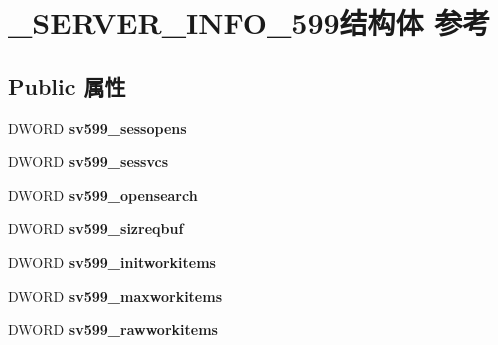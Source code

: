 \hypertarget{struct___s_e_r_v_e_r___i_n_f_o__599}{}\section{\+\_\+\+S\+E\+R\+V\+E\+R\+\_\+\+I\+N\+F\+O\+\_\+599结构体 参考}
\label{struct___s_e_r_v_e_r___i_n_f_o__599}
\subsection*{Public 属性}
\begin{DoxyCompactItemize}
\item 
\mbox{\label{struct___s_e_r_v_e_r___i_n_f_o__599_ae3a03367f6ae00a89f0eced51fe364fc}} 
D\+W\+O\+RD {\bfseries sv599\+\_\+sessopens}
\item 
\mbox{\label{struct___s_e_r_v_e_r___i_n_f_o__599_a2b73fc6352cf9ce4fa5232a3596e85be}} 
D\+W\+O\+RD {\bfseries sv599\+\_\+sessvcs}
\item 
\mbox{\label{struct___s_e_r_v_e_r___i_n_f_o__599_a9fa1b2f721e167e4da70370e2d5b202f}} 
D\+W\+O\+RD {\bfseries sv599\+\_\+opensearch}
\item 
\mbox{\label{struct___s_e_r_v_e_r___i_n_f_o__599_ab2aee9f0fbc8bce4a9fc1c5a16e3721a}} 
D\+W\+O\+RD {\bfseries sv599\+\_\+sizreqbuf}
\item 
\mbox{\label{struct___s_e_r_v_e_r___i_n_f_o__599_a953dd8f8ef06c61465ba9499aaed3903}} 
D\+W\+O\+RD {\bfseries sv599\+\_\+initworkitems}
\item 
\mbox{\label{struct___s_e_r_v_e_r___i_n_f_o__599_aaa9488be9c2708b9fd3dc2ad116327dc}} 
D\+W\+O\+RD {\bfseries sv599\+\_\+maxworkitems}
\item 
\mbox{\label{struct___s_e_r_v_e_r___i_n_f_o__599_a316de27aa33e41697f096ec33c142a2b}} 
D\+W\+O\+RD {\bfseries sv599\+\_\+rawworkitems}
\item 
\mbox{\label{struct___s_e_r_v_e_r___i_n_f_o__599_ad0fb146fcc5349583a575d6e56e3d9ca}} 

\end{DoxyCompactItemize}
